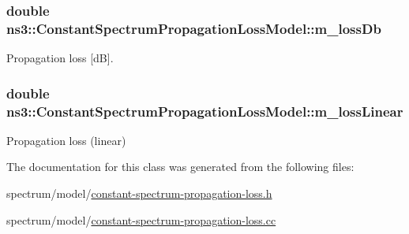 \subsubsection[{\texorpdfstring{m\+\_\+loss\+Db}{m_lossDb}}]{\setlength{\rightskip}{0pt plus 5cm}double ns3\+::\+Constant\+Spectrum\+Propagation\+Loss\+Model\+::m\+\_\+loss\+Db\hspace{0.3cm}{\ttfamily [protected]}}\hypertarget{classns3_1_1ConstantSpectrumPropagationLossModel_a823aa80fb08a982e52ec6c0bb0fb369c}{}\label{classns3_1_1ConstantSpectrumPropagationLossModel_a823aa80fb08a982e52ec6c0bb0fb369c}


Propagation loss \mbox{[}dB\mbox{]}. 

\subsubsection[{\texorpdfstring{m\+\_\+loss\+Linear}{m_lossLinear}}]{\setlength{\rightskip}{0pt plus 5cm}double ns3\+::\+Constant\+Spectrum\+Propagation\+Loss\+Model\+::m\+\_\+loss\+Linear\hspace{0.3cm}{\ttfamily [protected]}}\hypertarget{classns3_1_1ConstantSpectrumPropagationLossModel_ae11cc2f57fc332dd4c2cda8e665f3f0d}{}\label{classns3_1_1ConstantSpectrumPropagationLossModel_ae11cc2f57fc332dd4c2cda8e665f3f0d}


Propagation loss (linear) 



The documentation for this class was generated from the following files\+:\begin{DoxyCompactItemize}
\item 
spectrum/model/\hyperlink{constant-spectrum-propagation-loss_8h}{constant-\/spectrum-\/propagation-\/loss.\+h}\item 
spectrum/model/\hyperlink{constant-spectrum-propagation-loss_8cc}{constant-\/spectrum-\/propagation-\/loss.\+cc}\end{DoxyCompactItemize}
